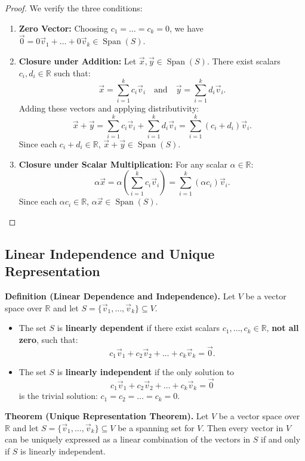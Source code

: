 \begin{proof}
We verify the three conditions:
\begin{enumerate}[itemsep=0.8em, topsep=0.5em]
    \item \textbf{Zero Vector:} Choosing $c_1 = \dots = c_k = 0$, we have $\vec{0} = 0\vec{v}_1 + \dots + 0\vec{v}_k \in \operatorname{Span}(S)$.
    \item \textbf{Closure under Addition:} Let $\vec{x}, \vec{y} \in \operatorname{Span}(S)$. There exist scalars $c_i, d_i \in \mathbb{R}$ such that:
    \[
    \vec{x} = \sum_{i=1}^k c_i\vec{v}_i \quad \text{and} \quad \vec{y} = \sum_{i=1}^k d_i\vec{v}_i.
    \]
    Adding these vectors and applying distributivity:
    \[
    \vec{x} + \vec{y} = \sum_{i=1}^k c_i\vec{v}_i + \sum_{i=1}^k d_i\vec{v}_i = \sum_{i=1}^k (c_i + d_i)\vec{v}_i.
    \]
    Since each $c_i + d_i \in \mathbb{R}$, $\vec{x} + \vec{y} \in \operatorname{Span}(S)$.
    \item \textbf{Closure under Scalar Multiplication:} For any scalar $\alpha \in \mathbb{R}$:
    \[
    \alpha \vec{x} = \alpha \left( \sum_{i=1}^k c_i\vec{v}_i \right) = \sum_{i=1}^k (\alpha c_i)\vec{v}_i.
    \]
    Since each $\alpha c_i \in \mathbb{R}$, $\alpha \vec{x} \in \operatorname{Span}(S)$.
\end{enumerate}
\end{proof}

\subsection{Linear Independence and Unique Representation}


\noindent\textbf{Definition (Linear Dependence and Independence).} 
Let $V$ be a vector space over $\mathbb{R}$ and let $S = \{\vec{v}_1, \dots, \vec{v}_k\} \subseteq V$.
\begin{itemize}[itemsep=1em, topsep=0.5em]
      \item The set $S$ is \textbf{linearly dependent} if there exist scalars $c_1, \dots, c_k \in \mathbb{R}$, \textbf{not all zero}, such that:
    \[
    c_1 \vec{v}_1 + c_2 \vec{v}_2 + \dots + c_k \vec{v}_k = \vec{0}.
    \]
     \item The set $S$ is \textbf{linearly independent} if the only solution to
    \[
    c_1 \vec{v}_1 + c_2 \vec{v}_2 + \dots + c_k \vec{v}_k = \vec{0}
    \]
    is the trivial solution: $c_1 = c_2 = \dots = c_k = 0$.
\end{itemize}


\medskip
\noindent\textbf{Theorem (Unique Representation Theorem).} 
Let $V$ be a vector space over $\mathbb{R}$ and let $S = \{\vec{v}_1, \dots, \vec{v}_k\} \subseteq V$ be a spanning set for $V$. Then every vector in $V$ can be uniquely expressed as a linear combination of the vectors in $S$ if and only if $S$ is linearly independent.

